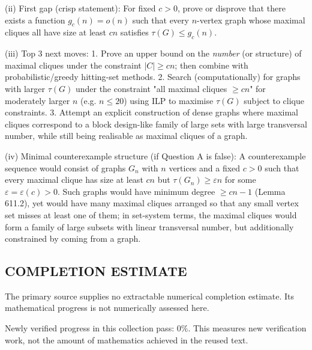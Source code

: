 (ii) First gap (crisp statement):
For fixed $c>0$, prove or disprove that there exists a function $g_c(n)=o(n)$ such that every $n$-vertex graph whose maximal cliques all have size at least $cn$ satisfies $\tau(G)\le g_c(n)$.

(iii) Top 3 next moves:
1. Prove an upper bound on the \emph{number} (or structure) of maximal cliques under the constraint $|C|\ge cn$; then combine with probabilistic/greedy hitting-set methods.
2. Search (computationally) for graphs with larger $\tau(G)$ under the constraint "all maximal cliques $\ge cn$" for moderately larger $n$ (e.g. $n\le 20$) using ILP to maximise $\tau(G)$ subject to clique constraints.
3. Attempt an explicit construction of dense graphs where maximal cliques correspond to a block design-like family of large sets with large transversal number, while still being realisable as maximal cliques of a graph.

(iv) Minimal counterexample structure (if Question A is false):
A counterexample sequence would consist of graphs $G_n$ with $n$ vertices and a fixed $c>0$ such that every maximal clique has size at least $cn$ but $\tau(G_n)\ge \varepsilon n$ for some $\varepsilon=\varepsilon(c)>0$.
Such graphs would have minimum degree $\ge cn-1$ (Lemma 611.2), yet would have many maximal cliques arranged so that any small vertex set misses at least one of them; in set-system terms, the maximal cliques would form a family of large subsets with linear transversal number, but additionally constrained by coming from a graph.


\subsection*{COMPLETION ESTIMATE}
The primary source supplies no extractable numerical completion estimate. Its mathematical progress is not numerically assessed here.

Newly verified progress in this collection pass: $0\%$. This measures new verification work, not the amount of mathematics achieved in the reused text.
